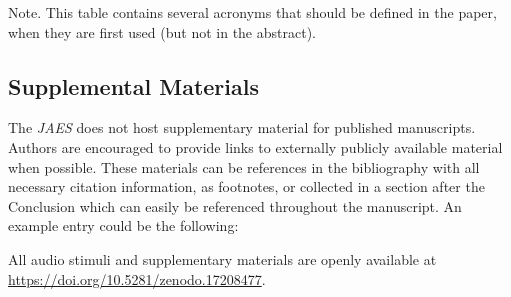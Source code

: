 \documentclass[fleqn]{jaes}
\begin{document}
\begin{table}[tb]
\centering
\caption{Tables should have a brief caption. Highlighting the best result(s) is helpful to readers. Highlighting should use bold font, color or shaded cells are not acceptable. Numbers should be decimal aligned while text is left aligned.}
\label{table:an_example_table}
\begin{tabnote}
Note. This table contains several acronyms that should be defined in the paper, when they are first used (but not in the abstract).
\end{tabnote}
\end{table}

\subsection{Supplemental Materials}

The \emph{JAES} does not host supplementary material for published manuscripts. Authors are encouraged to provide links to externally publicly available material when possible. These materials can be references in the bibliography with all necessary citation information, as footnotes, or collected in a section after the Conclusion which can  easily be referenced throughout the manuscript. An example entry could be the following: 

All audio stimuli and supplementary materials are openly available at \href{https://doi.org/10.5281/zenodo.17208477}{https://doi.org/10.5281/zenodo.17208477}.
\end{document}
